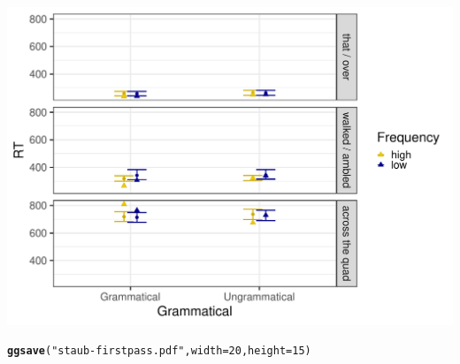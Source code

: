 \documentclass{article}\usepackage[]{graphicx}\usepackage[]{color}
\makeatletter
\def\maxwidth{ %
  \ifdim\Gin@nat@width>\linewidth
    \linewidth
  \else
    \Gin@nat@width
  \fi
}
\newcommand{\hlnum}[1]{\textcolor[rgb]{0.686,0.059,0.569}{#1}}%
\newcommand{\hlstr}[1]{\textcolor[rgb]{0.192,0.494,0.8}{#1}}%
\newcommand{\hlstd}[1]{\textcolor[rgb]{0.345,0.345,0.345}{#1}}%
\newcommand{\hlkwc}[1]{\textcolor[rgb]{0.333,0.667,0.333}{#1}}%
\newcommand{\hlkwd}[1]{\textcolor[rgb]{0.737,0.353,0.396}{\textbf{#1}}}%
\newenvironment{kframe}{%
 \def\at@end@of@kframe{}%
 \ifinner\ifhmode%
  \def\at@end@of@kframe{\end{minipage}}%
  \begin{minipage}{\columnwidth}%
 \fi\fi%
 \def\FrameCommand##1{\hskip\@totalleftmargin \hskip-\fboxsep
 \colorbox{shadecolor}{##1}\hskip-\fboxsep
     \hskip-\linewidth \hskip-\@totalleftmargin \hskip\columnwidth}%
 \MakeFramed {\advance\hsize-\width
   \@totalleftmargin\z@ \linewidth\hsize
   \@setminipage}}%
 {\par\unskip\endMakeFramed%
 \at@end@of@kframe}
\newenvironment{knitrout}{}{} %
\makeatother
\begin{document}
\begin{knitrout}
\color{fgcolor}
\includegraphics[width=\maxwidth]{figures/figure_staub_exp3unnamed-chunk-5-1} 

\end{knitrout}


\begin{knitrout}
\color{fgcolor}\begin{kframe}
\begin{alltt}
\hlkwd{ggsave}\hlstd{(}\hlstr{"staub-firstpass.pdf"}\hlstd{,} \hlkwc{width} \hlstd{=} \hlnum{20}\hlstd{,} \hlkwc{height} \hlstd{=} \hlnum{15}\hlstd{)}
\end{alltt}
\end{kframe}
\end{knitrout}
\end{document}
